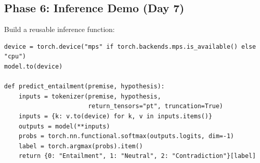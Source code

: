\subsection{Phase 6: Inference Demo (Day 7)}

Build a reusable inference function:
\begin{verbatim}
device = torch.device("mps" if torch.backends.mps.is_available() else "cpu")
model.to(device)

def predict_entailment(premise, hypothesis):
    inputs = tokenizer(premise, hypothesis,
                       return_tensors="pt", truncation=True)
    inputs = {k: v.to(device) for k, v in inputs.items()}
    outputs = model(**inputs)
    probs = torch.nn.functional.softmax(outputs.logits, dim=-1)
    label = torch.argmax(probs).item()
    return {0: "Entailment", 1: "Neutral", 2: "Contradiction"}[label]
\end{verbatim}
